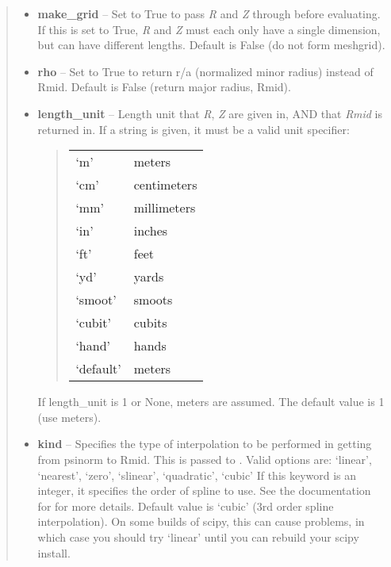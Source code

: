 \documentclass[letterpaper,10pt,english]{sphinxmanual}
\begin{document}
\begin{fulllineitems}
\begin{fulllineitems}
\begin{quote}
\begin{description}
\begin{itemize}
\item {} 
\textbf{make\_grid} -- Set to True to pass \emph{R} and \emph{Z} through
 before evaluating. If this is set to
True, \emph{R} and \emph{Z} must each only have a single dimension, but
can have different lengths. Default is False (do not form
meshgrid).

\item {} 
\textbf{rho} -- Set to True to return r/a (normalized minor radius)
instead of Rmid. Default is False (return major radius, Rmid).

\item {} 
\textbf{length\_unit} -- 
Length unit that \emph{R}, \emph{Z} are given in,
AND that \emph{Rmid} is returned in. If a string is given, it must
be a valid unit specifier:
\begin{quote}

\begin{tabulary}{\linewidth}{|L|L|}
\hline

`m'
 & 
meters
\\

`cm'
 & 
centimeters
\\

`mm'
 & 
millimeters
\\

`in'
 & 
inches
\\

`ft'
 & 
feet
\\

`yd'
 & 
yards
\\

`smoot'
 & 
smoots
\\

`cubit'
 & 
cubits
\\

`hand'
 & 
hands
\\

`default'
 & 
meters
\\
\hline\end{tabulary}

\end{quote}

If length\_unit is 1 or None, meters are assumed. The default
value is 1 (use meters).


\item {} 
\textbf{kind} -- Specifies the type of
interpolation to be performed in getting from psinorm to
Rmid. This is passed to
. Valid options are:
`linear', `nearest', `zero', `slinear', `quadratic', `cubic'
If this keyword is an integer, it specifies the order of spline
to use. See the documentation for  for more
details. Default value is `cubic' (3rd order spline
interpolation). On some builds of scipy, this can cause problems,
in which case you should try `linear' until you can rebuild your
scipy install.


\end{itemize}
\end{description}
\end{quote}
\end{fulllineitems}
\end{fulllineitems}
\end{document}

